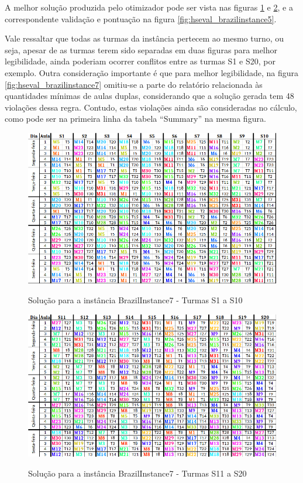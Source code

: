 \newpage
A melhor solução produzida pelo otimizador pode ser vista nas figuras \ref{fig:brazilinstance7_solucao} e \ref{fig:brazilinstance7_solucao_2}, e a correspondente validação e pontuação na figura \ref{fig:hseval_brazilinstance5}.

Vale ressaltar que todas as turmas da instância pertecem ao mesmo turno, ou seja, apesar de as turmas terem sido separadas em duas figuras para melhor legibilidade, ainda poderiam ocorrer conflitos entre as turmas S1 e S20, por exemplo. Outra consideração importante é que para melhor legibilidade, na figura \ref{fig:hseval_brazilinstance7} omitiu-se a parte do relatório relacionada às quantidades mínimas de aulas duplas, considerando que a solução gerada tem 48 violações dessa regra. Contudo, estas violações ainda são consideradas no cálculo, como pode ser na primeira linha da tabela ``Summary'' na mesma figura.

\begin{figure}[h]
	\centering
	\caption{Solução para a instância BrazilInstance7 - Turmas S1 a S10}
	\includegraphics[width=1\textwidth]{./dados/figuras/brazilinstance7}
	\label{fig:brazilinstance7_solucao}
\end{figure}

\begin{figure}[h]
	\centering
	\caption{Solução para a instância BrazilInstance7 - Turmas S11 a S20}
	\includegraphics[width=1\textwidth]{./dados/figuras/brazilinstance7_2}
	\label{fig:brazilinstance7_solucao_2}
\end{figure}

